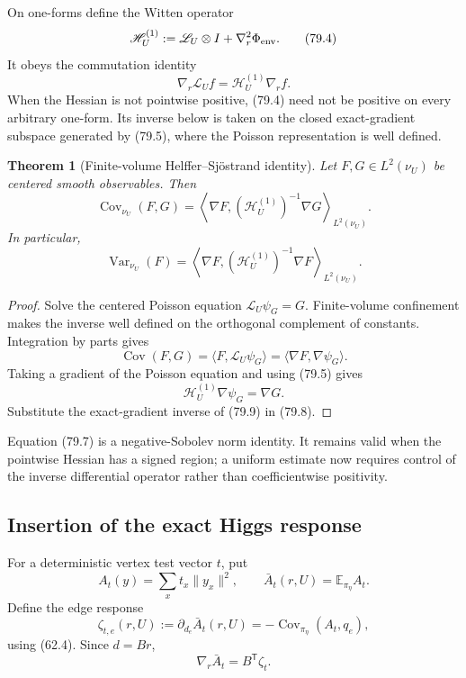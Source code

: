 \documentclass[11pt]{article}
\newtheorem{theorem}{Theorem}[section]
\theoremstyle{remark}
\begin{document}
On one-forms define the Witten operator
\[
 \mathscr H_U^{(1)}
 :=\mathscr L_U\otimes I+
 \nabla_r^2\Phi_{\rm env}.                        \tag{79.4}
\]
It obeys the commutation identity
\[
 \nabla_r\mathscr L_Uf
 =\mathscr H_U^{(1)}\nabla_rf.                   \tag{79.5}
\]
When the Hessian is not pointwise positive, (79.4) need not be
positive on every arbitrary one-form.  Its inverse below is taken on
the closed exact-gradient subspace generated by (79.5), where the
Poisson representation is well defined.

\begin{theorem}[Finite-volume Helffer--Sj\"ostrand identity]
\label{thm:v17v79-hs}
Let \(F,G\in L^2(\nu_U)\) be centered smooth observables.  Then
\[
\boxed{
 \operatorname{Cov}_{\nu_U}(F,G)
 =\left\langle
 \nabla F,(\mathscr H_U^{(1)})^{-1}\nabla G
 \right\rangle_{L^2(\nu_U)}.}                    \tag{79.6}
\]
In particular,
\[
 \operatorname{Var}_{\nu_U}(F)
 =\left\langle
 \nabla F,(\mathscr H_U^{(1)})^{-1}\nabla F
 \right\rangle_{L^2(\nu_U)}.                     \tag{79.7}
\]
\end{theorem}

\begin{proof}
Solve the centered Poisson equation
\(\mathscr L_U\psi_G=G\).  Finite-volume confinement makes the
inverse well defined on the orthogonal complement of constants.
Integration by parts gives
\[
 \operatorname{Cov}(F,G)
 =\langle F,\mathscr L_U\psi_G\rangle
 =\langle\nabla F,\nabla\psi_G\rangle.            \tag{79.8}
\]
Taking a gradient of the Poisson equation and using (79.5) gives
\[
 \mathscr H_U^{(1)}\nabla\psi_G=\nabla G.         \tag{79.9}
\]
Substitute the exact-gradient inverse of (79.9) in (79.8).
\end{proof}

Equation (79.7) is a negative-Sobolev norm identity.  It remains valid
when the pointwise Hessian has a signed region; a uniform estimate now
requires control of the inverse differential operator rather than
coefficientwise positivity.

\subsection{Insertion of the exact Higgs response}

For a deterministic vertex test vector \(t\), put
\[
 A_t(y)=\sum_xt_x\|y_x\|^2,
 \qquad
 \bar A_t(r,U)=\mathbb E_{\pi_\eta}A_t.           \tag{79.10}
\]
Define the edge response
\[
 \zeta_{t,e}(r,U)
 :=\partial_{d_e}\bar A_t(r,U)
 =-\operatorname{Cov}_{\pi_\eta}(A_t,q_e),        \tag{79.11}
\]
using (62.4).  Since \(d=Br\),
\[
 \nabla_r\bar A_t=B^{\mathsf T}\zeta_t.          \tag{79.12}
\]
\end{document}
